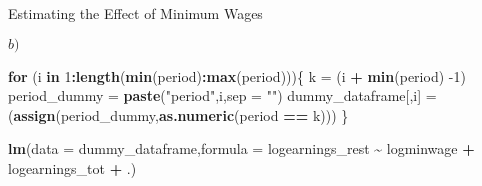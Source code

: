 \documentclass[
  ignorenonframetext,
]{beamer}
\newenvironment{Shaded}{\begin{snugshade}}{\end{snugshade}}
\newcommand{\ControlFlowTok}[1]{\textcolor[rgb]{0.13,0.29,0.53}{\textbf{#1}}}
\newcommand{\DataTypeTok}[1]{\textcolor[rgb]{0.13,0.29,0.53}{#1}}
\newcommand{\DecValTok}[1]{\textcolor[rgb]{0.00,0.00,0.81}{#1}}
\newcommand{\KeywordTok}[1]{\textcolor[rgb]{0.13,0.29,0.53}{\textbf{#1}}}
\newcommand{\NormalTok}[1]{#1}
\newcommand{\OperatorTok}[1]{\textcolor[rgb]{0.81,0.36,0.00}{\textbf{#1}}}
\newcommand{\StringTok}[1]{\textcolor[rgb]{0.31,0.60,0.02}{#1}}
\begin{document}
\begin{frame}[fragile]{Estimating the Effect of Minimum Wages}
\begin{block}{\(b)\)}
\begin{Shaded}
\begin{Highlighting}[]
\ControlFlowTok{for}\NormalTok{ (i }\ControlFlowTok{in} \DecValTok{1}\OperatorTok{:}\KeywordTok{length}\NormalTok{(}\KeywordTok{min}\NormalTok{(period)}\OperatorTok{:}\KeywordTok{max}\NormalTok{(period)))\{}
\NormalTok{   k =}\StringTok{ }\NormalTok{(i }\OperatorTok{+}\StringTok{ }\KeywordTok{min}\NormalTok{(period) }\DecValTok{{-}1}\NormalTok{)}
\NormalTok{   period\_dummy =}\StringTok{ }\KeywordTok{paste}\NormalTok{(}\StringTok{"period"}\NormalTok{,i,}\DataTypeTok{sep =} \StringTok{""}\NormalTok{)}
\NormalTok{   dummy\_dataframe[,i] =}\StringTok{ }\NormalTok{(}\KeywordTok{assign}\NormalTok{(period\_dummy,}\KeywordTok{as.numeric}\NormalTok{(period }\OperatorTok{==}\StringTok{ }\NormalTok{k))) }
\NormalTok{\}}



\KeywordTok{lm}\NormalTok{(}\DataTypeTok{data =}\NormalTok{ dummy\_dataframe,}\DataTypeTok{formula =}\NormalTok{ logearnings\_rest }\OperatorTok{\textasciitilde{}}\StringTok{ }\NormalTok{logminwage }\OperatorTok{+}\StringTok{ }\NormalTok{logearnings\_tot }\OperatorTok{+}\StringTok{ }\NormalTok{.)}
\end{Highlighting}
\end{Shaded}


\end{block}
\end{frame}
\end{document}
